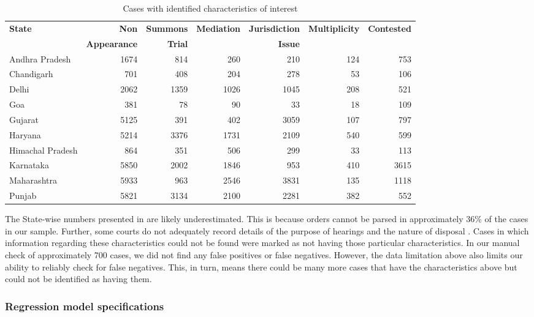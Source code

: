 {\footnotesize
 \begin{longtable}{@{}lrrrrrr@{}}
 \caption{Cases with identified characteristics of interest}
 \label{tab:case_chars}\\
 \toprule
 \textbf{State} & \textbf{Non} & \textbf{Summons} & \textbf{Mediation} & \textbf{Jurisdiction} & \textbf{Multiplicity} & \textbf{Contested} \\
 & \textbf{Appearance} & \textbf{Trial} & & \textbf{Issue} & &\\
 \midrule
 \endhead
 Andhra Pradesh & 1674 & 814 & 260 & 210 & 124 & 753 \\
 Chandigarh & 701 & 408 & 204 & 278 & 53 & 106 \\
 Delhi & 2062 & 1359 & 1026 & 1045 & 208 & 521 \\
 Goa & 381 & 78 & 90 & 33 & 18 & 109 \\
 Gujarat & 5125 & 391 & 402 & 3059 & 107 & 797 \\
 Haryana & 5214 & 3376 & 1731 & 2109 & 540 & 599 \\
 Himachal Pradesh & 864 & 351 & 506 & 299 & 33 & 113 \\
 Karnataka & 5850 & 2002 & 1846 & 953 & 410 & 3615 \\
 Maharashtra & 5933 & 963 & 2546 & 3831 & 135 & 1118 \\
 Punjab & 5821 & 3134 & 2100 & 2281 & 382 & 552 \\
 \bottomrule
\end{longtable}
}

The State-wise numbers presented in  are likely underestimated. This is because orders cannot be parsed in approximately 36\% of the cases in our sample. Further, some courts do not adequately record details of the purpose of hearings and the nature of disposal \autocite{damle2020_ecourtsData}. Cases in which information regarding these characteristics could not be found were marked as not having those particular characteristics. In our manual check of approximately 700 cases, we did not find any false positives or false negatives. However, the data limitation above also limits our ability to reliably check for false negatives. This, in turn, means there could be many more cases that have the characteristics above but could not be identified as having them.

\subsubsection{Regression model specifications} \label{sec:model-selection}


